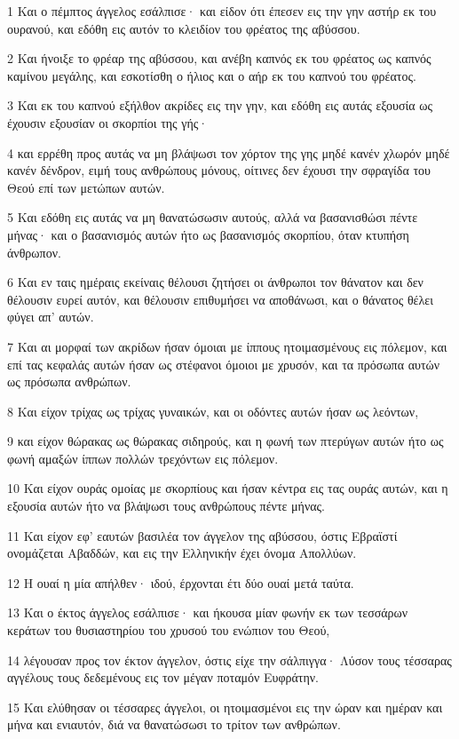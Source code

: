 \par 1 Και ο πέμπτος άγγελος εσάλπισε· και είδον ότι έπεσεν εις την γην αστήρ εκ του ουρανού, και εδόθη εις αυτόν το κλειδίον του φρέατος της αβύσσου.
\par 2 Και ήνοιξε το φρέαρ της αβύσσου, και ανέβη καπνός εκ του φρέατος ως καπνός καμίνου μεγάλης, και εσκοτίσθη ο ήλιος και ο αήρ εκ του καπνού του φρέατος.
\par 3 Και εκ του καπνού εξήλθον ακρίδες εις την γην, και εδόθη εις αυτάς εξουσία ως έχουσιν εξουσίαν οι σκορπίοι της γής·
\par 4 και ερρέθη προς αυτάς να μη βλάψωσι τον χόρτον της γης μηδέ κανέν χλωρόν μηδέ κανέν δένδρον, ειμή τους ανθρώπους μόνους, οίτινες δεν έχουσι την σφραγίδα του Θεού επί των μετώπων αυτών.
\par 5 Και εδόθη εις αυτάς να μη θανατώσωσιν αυτούς, αλλά να βασανισθώσι πέντε μήνας· και ο βασανισμός αυτών ήτο ως βασανισμός σκορπίου, όταν κτυπήση άνθρωπον.
\par 6 Και εν ταις ημέραις εκείναις θέλουσι ζητήσει οι άνθρωποι τον θάνατον και δεν θέλουσιν ευρεί αυτόν, και θέλουσιν επιθυμήσει να αποθάνωσι, και ο θάνατος θέλει φύγει απ' αυτών.
\par 7 Και αι μορφαί των ακρίδων ήσαν όμοιαι με ίππους ητοιμασμένους εις πόλεμον, και επί τας κεφαλάς αυτών ήσαν ως στέφανοι όμοιοι με χρυσόν, και τα πρόσωπα αυτών ως πρόσωπα ανθρώπων.
\par 8 Και είχον τρίχας ως τρίχας γυναικών, και οι οδόντες αυτών ήσαν ως λεόντων,
\par 9 και είχον θώρακας ως θώρακας σιδηρούς, και η φωνή των πτερύγων αυτών ήτο ως φωνή αμαξών ίππων πολλών τρεχόντων εις πόλεμον.
\par 10 Και είχον ουράς ομοίας με σκορπίους και ήσαν κέντρα εις τας ουράς αυτών, και η εξουσία αυτών ήτο να βλάψωσι τους ανθρώπους πέντε μήνας.
\par 11 Και είχον εφ' εαυτών βασιλέα τον άγγελον της αβύσσου, όστις Εβραϊστί ονομάζεται Αβαδδών, και εις την Ελληνικήν έχει όνομα Απολλύων.
\par 12 Η ουαί η μία απήλθεν· ιδού, έρχονται έτι δύο ουαί μετά ταύτα.
\par 13 Και ο έκτος άγγελος εσάλπισε· και ήκουσα μίαν φωνήν εκ των τεσσάρων κεράτων του θυσιαστηρίου του χρυσού του ενώπιον του Θεού,
\par 14 λέγουσαν προς τον έκτον άγγελον, όστις είχε την σάλπιγγα· Λύσον τους τέσσαρας αγγέλους τους δεδεμένους εις τον μέγαν ποταμόν Ευφράτην.
\par 15 Και ελύθησαν οι τέσσαρες άγγελοι, οι ητοιμασμένοι εις την ώραν και ημέραν και μήνα και ενιαυτόν, διά να θανατώσωσι το τρίτον των ανθρώπων.
